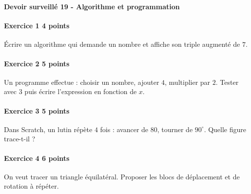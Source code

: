 \documentclass[a4paper,10pt]{article}
\newenvironment{exercice}[2]{\paragraph{Exercice #1 \hfill #2 points}\mbox{}\par}{\medskip}
\begin{document}
\begin{center}\Large\bfseries Devoir surveillé 19 - Algorithme et programmation\end{center}
\vspace{2mm}
\begin{exercice}{1}{4}Écrire un algorithme qui demande un nombre et affiche son triple augmenté de $7$.\end{exercice}\begin{exercice}{2}{5}Un programme effectue : choisir un nombre, ajouter $4$, multiplier par $2$. Tester avec $3$ puis écrire l'expression en fonction de $x$.\end{exercice}\begin{exercice}{3}{5}Dans Scratch, un lutin répète $4$ fois : avancer de $80$, tourner de $90^\circ$. Quelle figure trace-t-il ?\end{exercice}\begin{exercice}{4}{6}On veut tracer un triangle équilatéral. Proposer les blocs de déplacement et de rotation à répéter.\end{exercice}
\end{document}
